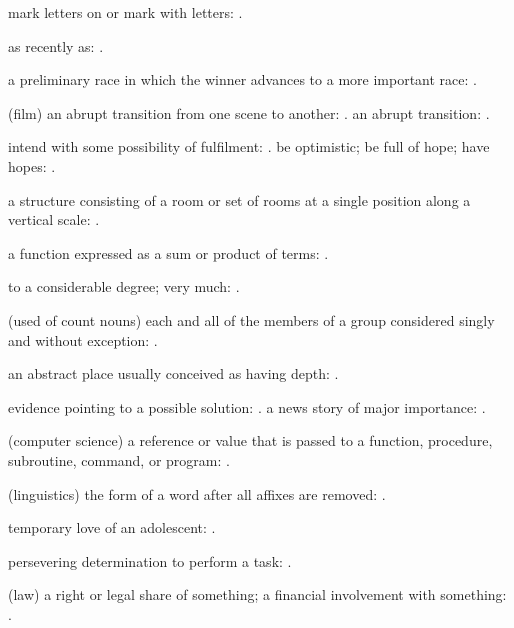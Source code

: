   mark letters on or mark with letters: .

  as recently as: .

  a preliminary race in which the winner advances to a more important race: .

  (film) an abrupt transition from one scene to another: . an abrupt transition:   .

  intend with some possibility of fulfilment:   . be optimistic; be full of hope; have hopes: .

  a structure consisting of a room or set of rooms at a single position along a vertical scale:   .

  a function expressed as a sum or product of terms: .

  to a considerable degree; very much: .

  (used of count nouns) each and all of the members of a group considered singly and without exception: .

  an abstract place usually conceived as having depth:   .

  evidence pointing to a possible solution:   . a news story of major importance:   .

  (computer science) a reference or value that is passed to a function, procedure, subroutine, command, or program:   .

  (linguistics) the form of a word after all affixes are removed:   .

  temporary love of an adolescent:   .

  persevering determination to perform a task:   .

  (law) a right or legal share of something; a financial involvement with something:   .

